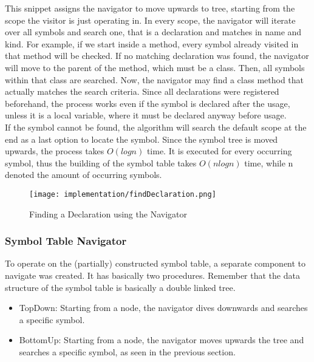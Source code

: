 This snippet assigns the navigator to move upwards to tree, starting from the scope the visitor is just operating in.
In every scope, the navigator will iterate over all symbols and search one, that is a declaration and matches in name and kind.
For example, if we start inside a method, every symbol already visited in that method will be checked.
If no matching declaration was found, the navigator will move to the parent of the method, which must be a class.
Then, all symbols within that class are searched.
Now, the navigator may find a class method that actually matches the search criteria.
Since all declarations were registered beforehand, the process works even if the symbol is declared after the usage, unless it is a local variable, where it must be declared anyway before usage.\\

If the symbol cannot be found, the algorithm will search the default scope at the end as a last option to locate the symbol.
Since the symbol tree is moved upwards, the process takes $O(logn)$ time.
It is executed for every occurring symbol, thus the building of the symbol table takes $O(nlogn)$ time, while n denoted the amount of occurring symbols.\\

\begin{figure}[h]
    \centering
    \texttt{[image: implementation/findDeclaration.png]}
    \caption{Finding a Declaration using the Navigator}
    \label{fig:findDecl}
\end{figure}



\subsubsection{Symbol Table Navigator}
To operate on the (partially) constructed symbol table, a separate component to navigate was created.
It has basically two procedures.
Remember that the data structure of the symbol table is basically a double linked tree.

\begin{itemize}
\item TopDown: Starting from a node, the navigator dives downwards and searches a specific symbol.
\item BottomUp: Starting from a node, the navigator moves upwards the tree and searches a specific symbol, as seen in the previous section.
\end{itemize}

